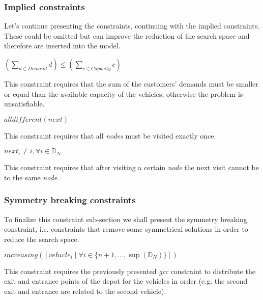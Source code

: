 \documentclass[../main.tex]{subfiles}
\begin{document}
\subsubsection{Implied constraints}
Let's continue presenting the constraints, continuing with the implied constraints. These could be omitted but can improve the reduction of the search space and therefore are inserted into the model.\\
\begin{center} %
    \begin{math}
        (\sum_{d \in Demand}{d}) \leq (\sum_{c \in Capacity}{c})
    \end{math}
\end{center}
This constraint requires that the sum of the customers' demands must be smaller or equal than the available capacity of the vehicles, otherwise the problem is unsatisfiable.

\begin{center} %
    \begin{math}
        alldifferent(next)
    \end{math}
\end{center}
This constraint requires that all \textit{nodes} must be visited exactly once.

\begin{center}
    \begin{math}
        next_i \neq i, \forall i \in \mathbb{D}_N
    \end{math}
\end{center}
This constraint requires that after visiting a certain \textit{node} the next visit cannot be to the same \textit{node}.

\subsubsection{Symmetry breaking constraints}
To finalize this constraint sub-section we shall present the symmetry breaking constraint, i.e. constraints that remove some symmetrical solutions in order to reduce the search space.
\begin{center} %
    \begin{math}
        increasing([vehicle_i \; | \; \forall i \in \{n+1,\dots,\sup{}(\mathbb{D}_N)\}])
    \end{math}
\end{center}
This constraint requires the previously presented \textit{gcc} constraint to distribute the exit and entrance points of the depot for the vehicles in order (e.g. the second exit and entrance are related to the second vehicle).
\end{document}
